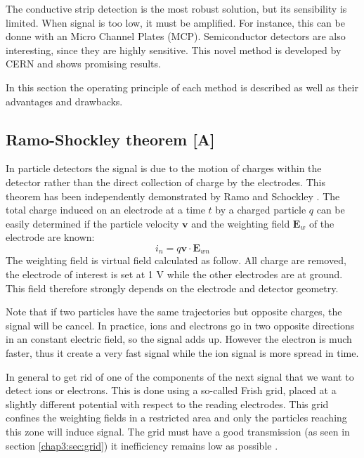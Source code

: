 \begin{refsection}
  The conductive strip detection is the most robust solution, but its sensibility is limited. When signal is too low, it must be amplified. For instance, this can be donne with an Micro Channel Plates (MCP). Semiconductor detectors are also interesting, since they are highly sensitive. This novel method is developed by CERN and shows promising results.
  
  In this section the operating principle of each method is described as well as their advantages and drawbacks.

  \subsection{Ramo-Shockley theorem [A]}
  \label{chap3:ramo}
  In particle detectors the signal is due to the motion of charges within the detector rather than the direct collection of charge by the electrodes. This theorem has been independently demonstrated by Ramo and Schockley \cite{Ramo_1939,Shockley_1938}. The total charge induced on an electrode at a time $t$ by a charged particle $q$ can be easily determined if the particle velocity $\boldsymbol{v}$ and the weighting field $\boldsymbol{E}_{w}$ of the electrode are known:
  \begin{equation}
    i_{n}= q\boldsymbol{v} \cdot \boldsymbol{E}_{wn}
  \end{equation}
  The weighting field is virtual field calculated as follow. All charge are removed, the electrode of interest is set at 1 V while the other electrodes are at ground. This field therefore strongly depends on the electrode and detector geometry.

  Note that if two particles have the same trajectories but opposite charges, the signal will be cancel. In practice, ions and electrons go in two opposite directions in an constant electric field, so the signal adds up. However the electron is much faster, thus it create a very fast signal while the ion signal is more spread in time.

  In general to get rid of one of the components of the next signal that we want to detect ions or electrons. This is done using a so-called Frish grid, placed at a slightly different potential with respect to the reading electrodes. This grid confines the weighting fields in a restricted area and only the particles reaching this zone will induce signal. The grid must have a good transmission (as seen in section \ref{chap3:sec:grid}) it inefficiency remains low as possible \cite{Khriachkov1997,Gook2012}.



\end{refsection}
